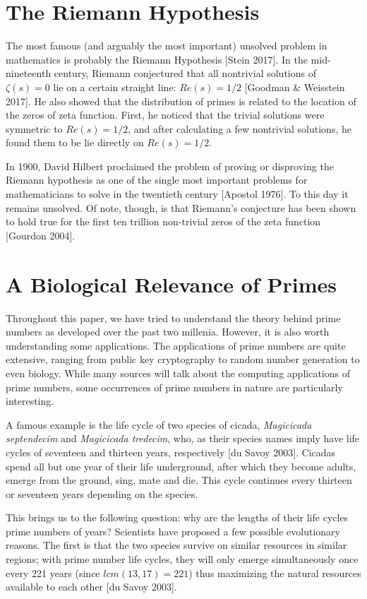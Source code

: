 \documentclass[11pt]{article}
\begin{document}
\section{The Riemann Hypothesis}
The most famous (and arguably the most important) unsolved problem in mathematics is probably the Riemann Hypothesis [Stein 2017]. In the mid-nineteenth century, Riemann conjectured that all nontrivial solutions of  $\zeta(s) = 0$ lie on a certain straight line: $Re(s) = 1/2$ [Goodman \& Weisstein 2017]. He also showed that the distribution of primes is related to the location of the zeros of zeta function. First, he noticed that the trivial solutions were symmetric to $Re(s) = 1/2$, and after calculating a few nontrivial solutions, he found them to be lie directly on $Re(s) = 1/2$. 

In 1900, David Hilbert proclaimed the problem of proving or disproving the Riemann hypothesis as one of the single most important problems for mathematicians to solve in the twentieth century [Apostol 1976]. To this day it remains unsolved. Of note, though, is that Riemann's conjecture has been shown to hold true for the first ten trillion non-trivial zeros of the zeta function [Gourdon 2004].  


\section{A Biological Relevance of Primes}
Throughout this paper, we have tried to understand the theory behind prime numbers as developed over the past two millenia. However, it is also worth understanding some applications. The applications of prime numbers are quite extensive, ranging from public key cryptography to random number generation to even biology. While many sources will talk about the computing applications of prime numbers, some occurrences of prime numbers in nature are particularly interesting. 

A famous example is the life cycle of two species of cicada, {\it Magicicada septendecim} and {\it Magicicada tredecim}, who, as their species names imply have life cycles of seventeen and thirteen years, respectively [du Savoy 2003]. Cicadas spend all but one year of their life underground, after which they become adults, emerge from the ground, sing, mate and die. This cycle continues every thirteen or seventeen years depending on the species. 

This brings us to the following question: why are the lengths of their life cycles prime numbers of years? Scientists have proposed a few possible evolutionary reasons. The first is that the two species survive on similar resources in similar regions; with prime number life cycles, they will only emerge simultaneously once every 221 years (since $lcm(13,17) = 221$) thus maximizing the natural resources available to each other [du Savoy 2003]. 
\end{document}

